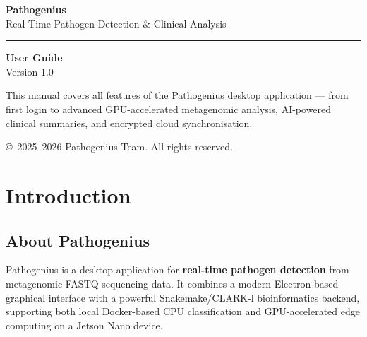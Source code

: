 \documentclass[12pt,a4paper]{report}
\begin{document}
\begin{titlepage}
  \pagecolor{darkbg}
  \color{white}
  \centering
  \vspace*{3cm}

  {\Huge\bfseries\color{primary} Pathogenius}\\[0.6em]
  {\large\color{white!80} Real-Time Pathogen Detection \& Clinical Analysis}

  \vspace{2cm}
  \rule{0.5\textwidth}{0.4pt}
  \vspace{2cm}

  {\LARGE\bfseries User Guide}\\[0.4em]
  {\large Version 1.0}

  \vspace{2cm}

  \begin{tcolorbox}[
      width=0.75\textwidth,
      colback=primarydark,
      colframe=primarylight,
      arc=6pt, boxrule=1pt,
      halign=center
  ]
    \small\color{white!80}
    This manual covers all features of the Pathogenius desktop
    application — from first login to advanced GPU-accelerated
    metagenomic analysis, AI-powered clinical summaries, and
    encrypted cloud synchronisation.
  \end{tcolorbox}

  \vfill
  {\small\color{white!50} \copyright\ 2025--2026 Pathogenius Team. All rights reserved.}
\end{titlepage}
\nopagecolor
\color{black}

\tableofcontents
\listoffigures

\chapter{Introduction}

\section{About Pathogenius}

Pathogenius is a desktop application for \textbf{real-time pathogen detection} from metagenomic FASTQ sequencing data. It combines a modern Electron-based graphical interface with a powerful Snakemake/CLARK-l bioinformatics backend, supporting both local Docker-based CPU classification and GPU-accelerated edge computing on a Jetson Nano device.
\end{document}
